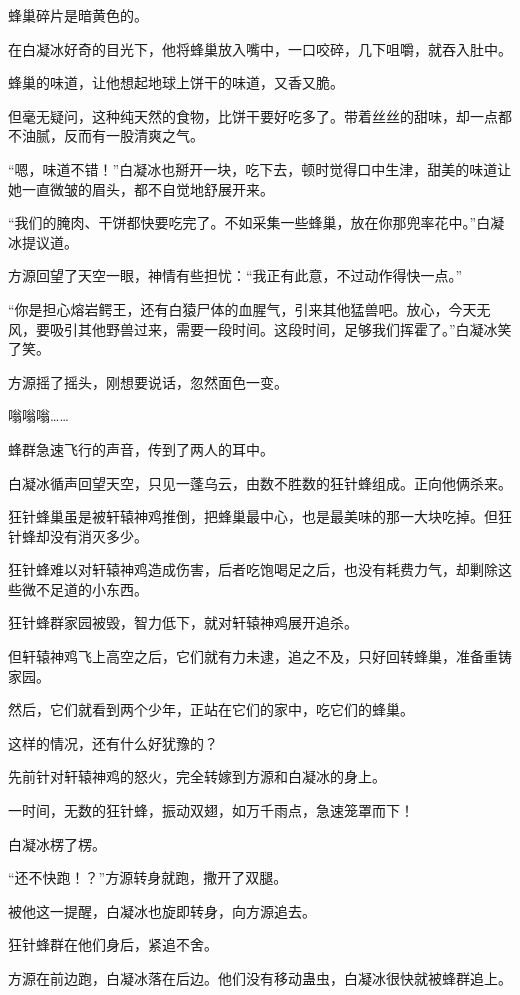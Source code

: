\begin{this_body}
蜂巢碎片是暗黄色的。

在白凝冰好奇的目光下，他将蜂巢放入嘴中，一口咬碎，几下咀嚼，就吞入肚中。

蜂巢的味道，让他想起地球上饼干的味道，又香又脆。

但毫无疑问，这种纯天然的食物，比饼干要好吃多了。带着丝丝的甜味，却一点都不油腻，反而有一股清爽之气。

“嗯，味道不错！”白凝冰也掰开一块，吃下去，顿时觉得口中生津，甜美的味道让她一直微皱的眉头，都不自觉地舒展开来。

“我们的腌肉、干饼都快要吃完了。不如采集一些蜂巢，放在你那兜率花中。”白凝冰提议道。

方源回望了天空一眼，神情有些担忧：“我正有此意，不过动作得快一点。”

“你是担心熔岩鳄王，还有白猿尸体的血腥气，引来其他猛兽吧。放心，今天无风，要吸引其他野兽过来，需要一段时间。这段时间，足够我们挥霍了。”白凝冰笑了笑。

方源摇了摇头，刚想要说话，忽然面色一变。

嗡嗡嗡……

蜂群急速飞行的声音，传到了两人的耳中。

白凝冰循声回望天空，只见一蓬乌云，由数不胜数的狂针蜂组成。正向他俩杀来。

狂针蜂巢虽是被轩辕神鸡推倒，把蜂巢最中心，也是最美味的那一大块吃掉。但狂针蜂却没有消灭多少。

狂针蜂难以对轩辕神鸡造成伤害，后者吃饱喝足之后，也没有耗费力气，却剿除这些微不足道的小东西。

狂针蜂群家园被毁，智力低下，就对轩辕神鸡展开追杀。

但轩辕神鸡飞上高空之后，它们就有力未逮，追之不及，只好回转蜂巢，准备重铸家园。

然后，它们就看到两个少年，正站在它们的家中，吃它们的蜂巢。

这样的情况，还有什么好犹豫的？

先前针对轩辕神鸡的怒火，完全转嫁到方源和白凝冰的身上。

一时间，无数的狂针蜂，振动双翅，如万千雨点，急速笼罩而下！

白凝冰楞了楞。

“还不快跑！？”方源转身就跑，撒开了双腿。

被他这一提醒，白凝冰也旋即转身，向方源追去。

狂针蜂群在他们身后，紧追不舍。

方源在前边跑，白凝冰落在后边。他们没有移动蛊虫，白凝冰很快就被蜂群追上。


\end{this_body}
